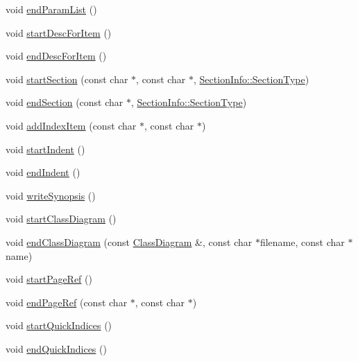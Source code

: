 \begin{DoxyCompactItemize}
\item 
void \hyperlink{class_r_t_f_generator_ac34fa07c0453017057bf8d6b9863c8d4}{end\+Param\+List} ()
\item 
void \hyperlink{class_r_t_f_generator_af015080aa4a53dc119385ed520258a93}{start\+Desc\+For\+Item} ()
\item 
void \hyperlink{class_r_t_f_generator_ad60deab094f7a994b685e0b55639839c}{end\+Desc\+For\+Item} ()
\item 
void \hyperlink{class_r_t_f_generator_aa28599035df308890bfb4abfcd322c6d}{start\+Section} (const char $\ast$, const char $\ast$, \hyperlink{struct_section_info_a32308f52dd59422b14fb75a92c90ebf1}{Section\+Info\+::\+Section\+Type})
\item 
void \hyperlink{class_r_t_f_generator_af33a34d8ccdbda134053ca89eeeacf5a}{end\+Section} (const char $\ast$, \hyperlink{struct_section_info_a32308f52dd59422b14fb75a92c90ebf1}{Section\+Info\+::\+Section\+Type})
\item 
void \hyperlink{class_r_t_f_generator_af35b41bf3bcf9a94af08ba6d68d2df23}{add\+Index\+Item} (const char $\ast$, const char $\ast$)
\item 
void \hyperlink{class_r_t_f_generator_a4dd78ad24988675c5a4b38ff3a5a120a}{start\+Indent} ()
\item 
void \hyperlink{class_r_t_f_generator_a9693d67a2739f84501b2110cba6e5662}{end\+Indent} ()
\item 
void \hyperlink{class_r_t_f_generator_ab563733ac3c9c90d116f7d3d24719bcc}{write\+Synopsis} ()
\item 
void \hyperlink{class_r_t_f_generator_ac5ecece390049b98cf025a674bf70f75}{start\+Class\+Diagram} ()
\item 
void \hyperlink{class_r_t_f_generator_a1115a488adc5c7ea481cbf6c3cd9eb0a}{end\+Class\+Diagram} (const \hyperlink{class_class_diagram}{Class\+Diagram} \&, const char $\ast$filename, const char $\ast$name)
\item 
void \hyperlink{class_r_t_f_generator_acfe100fa82bd9c75629790a719a6f711}{start\+Page\+Ref} ()
\item 
void \hyperlink{class_r_t_f_generator_af6443e553d28dc4b34cfed6567c530c7}{end\+Page\+Ref} (const char $\ast$, const char $\ast$)
\item 
void \hyperlink{class_r_t_f_generator_aa9a8e0a9531e1dd82931a2a8c0572500}{start\+Quick\+Indices} ()
\item 
void \hyperlink{class_r_t_f_generator_a1e804272e7498124acf895be2bcdb35a}{end\+Quick\+Indices} ()
\item 

\end{DoxyCompactItemize}
